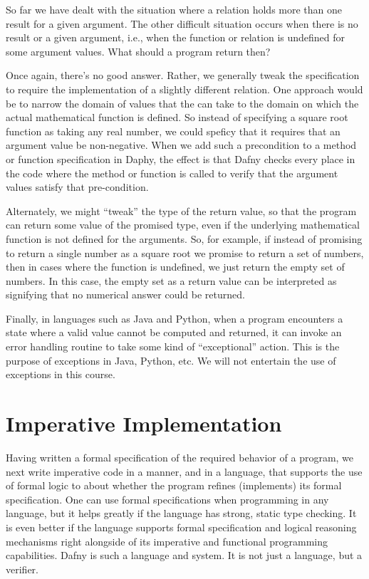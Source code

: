 \documentclass[letterpaper,10pt,english]{sphinxmanual}
\begin{document}
So far we have dealt with the situation where a relation holds more
than one result for a given argument. The other difficult situation
occurs when there is no result or a given argument, i.e., when the
function or relation is undefined for some argument values. What
should a program return then?

Once again, there’s no good answer. Rather, we generally tweak the
specification to require the implementation of a slightly different
relation. One approach would be to narrow the domain of values that
the  can take to the domain on which the actual mathematical
function is defined. So instead of specifying a square root function
as taking any real number, we could speficy that it requires that an
argument value be non-negative. When we add such a precondition to a
method or function specification in Daphy, the effect is that Dafny
checks every place in the code where the method or function is called
to verify that the argument values satisfy that pre-condition.

Alternately, we might “tweak” the type of the return value, so that
the program can return some value of the promised type, even if the
underlying mathematical function is not defined for the arguments. So,
for example, if instead of promising to return a single number as a
square root we promise to return a set of numbers, then in cases where
the function is undefined, we just return the empty set of numbers.
In this case, the empty set as a return value can be interpreted as
signifying that no numerical answer could be returned.

Finally, in languages such as Java and Python, when a program
encounters a state where a valid value cannot be computed and
returned, it can invoke an error handling routine to take some kind of
“exceptional” action. This is the purpose of exceptions in Java,
Python, etc. We will not entertain the use of exceptions in this
course.


\section{Imperative Implementation}
\label{\detokenize{05-verifying-logical-specifications:imperative-implementation}}
Having written a formal specification of the required 
behavior of a program, we next write imperative code in a manner, and
in a language, that supports the use of formal logic to  about
whether the program refines (implements) its formal specification. One
can use formal specifications when programming in any language, but it
helps greatly if the language has strong, static type checking. It is
even better if the language supports formal specification and logical
reasoning mechanisms right alongside of its imperative and functional
programming capabilities. Dafny is such a language and system. It is
not just a language, but a verifier.
\end{document}
